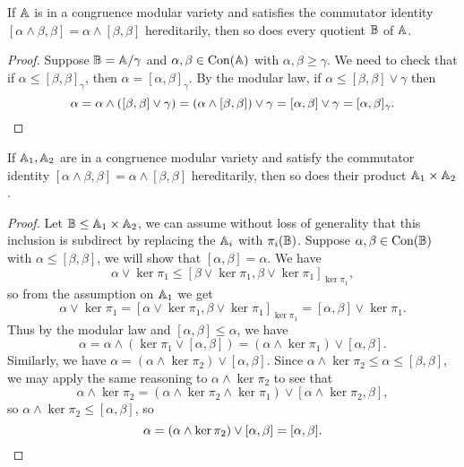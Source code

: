 \documentclass[letterpaper,11pt]{article}
\DeclareMathOperator{\Con}{Con}
\begin{document}
\begin{prop} If $\mathbb{A}$ is in a congruence modular variety and satisfies the commutator identity $[\alpha \wedge \beta,\beta] = \alpha \wedge [\beta,\beta]$ hereditarily, then so does every quotient $\mathbb{B}$ of $\mathbb{A}$.
\end{prop}
\begin{proof} Suppose $\mathbb{B} = \mathbb{A}/\gamma$ and $\alpha,\beta \in \Con(\bA)$ with $\alpha,\beta \ge \gamma$. We need to check that if $\alpha \le [\beta,\beta]_\gamma$, then $\alpha = [\alpha,\beta]_\gamma$. By the modular law, if $\alpha \le [\beta,\beta]\vee \gamma$ then
\[
\alpha = \alpha \wedge ([\beta,\beta]\vee \gamma) = (\alpha \wedge [\beta,\beta]) \vee \gamma = [\alpha,\beta] \vee \gamma = [\alpha,\beta]_\gamma.\qedhere
\]
\end{proof}

\begin{prop} If $\mathbb{A}_1,\mathbb{A}_2$ are in a congruence modular variety and satisfy the commutator identity $[\alpha\wedge \beta, \beta] = \alpha\wedge [\beta,\beta]$ hereditarily, then so does their product $\mathbb{A}_1 \times \mathbb{A}_2$.
\end{prop}
\begin{proof} Let $\mathbb{B} \le \mathbb{A}_1\times \mathbb{A}_2$, we can assume without loss of generality that this inclusion is subdirect by replacing the $\mathbb{A}_i$ with $\pi_i(\mathbb{B})$. Suppose $\alpha,\beta \in \Con(\bB)$ with $\alpha \le [\beta,\beta]$, we will show that $[\alpha,\beta] = \alpha$. We have
\[
\alpha \vee \ker\pi_1 \le [\beta\vee\ker\pi_1, \beta\vee\ker\pi_1]_{\ker \pi_1},
\]
so from the assumption on $\mathbb{A}_1$ we get
\[
\alpha \vee \ker \pi_1 = [\alpha \vee \ker\pi_1, \beta \vee \ker \pi_1]_{\ker \pi_1} = [\alpha,\beta]\vee \ker \pi_1.
\]
Thus by the modular law and $[\alpha,\beta] \le \alpha$, we have
\[
\alpha = \alpha\wedge (\ker \pi_1 \vee [\alpha,\beta]) = (\alpha \wedge \ker \pi_1) \vee [\alpha,\beta].
\]
Similarly, we have $\alpha = (\alpha \wedge \ker \pi_2) \vee [\alpha,\beta]$. Since $\alpha \wedge \ker \pi_2 \le \alpha \le [\beta,\beta]$, we may apply the same reasoning to $\alpha \wedge \ker \pi_2$ to see that
\[
\alpha \wedge \ker \pi_2 = (\alpha \wedge \ker \pi_2 \wedge \ker \pi_1) \vee [\alpha \wedge \ker \pi_2, \beta],
\]
so $\alpha \wedge \ker \pi_2 \le [\alpha,\beta]$, so
\[
\alpha = (\alpha \wedge \ker \pi_2) \vee [\alpha,\beta] = [\alpha,\beta].\qedhere
\]
\end{proof}
\end{document}
